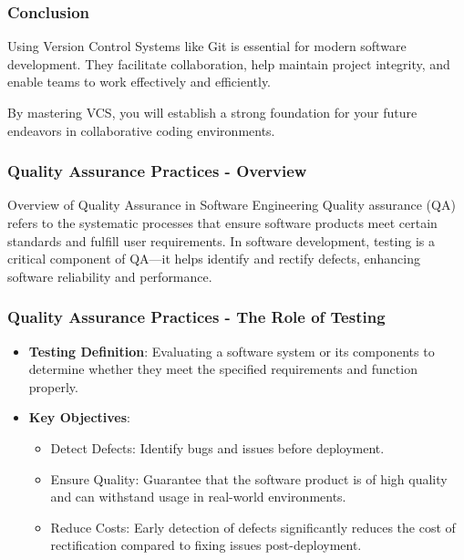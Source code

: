 \documentclass{beamer}
\begin{document}
\begin{frame}[fragile]
    \frametitle{Conclusion}
    Using Version Control Systems like Git is essential for modern software development. They facilitate collaboration, help maintain project integrity, and enable teams to work effectively and efficiently.
    
    By mastering VCS, you will establish a strong foundation for your future endeavors in collaborative coding environments.
\end{frame}

\begin{frame}[fragile]
    \frametitle{Quality Assurance Practices - Overview}
    \begin{block}{Overview of Quality Assurance in Software Engineering}
        Quality assurance (QA) refers to the systematic processes that ensure software products meet certain standards and fulfill user requirements. In software development, testing is a critical component of QA—it helps identify and rectify defects, enhancing software reliability and performance.
    \end{block}
\end{frame}

\begin{frame}[fragile]
    \frametitle{Quality Assurance Practices - The Role of Testing}
    \begin{itemize}
        \item \textbf{Testing Definition}: Evaluating a software system or its components to determine whether they meet the specified requirements and function properly.
        \item \textbf{Key Objectives}:
        \begin{itemize}
            \item Detect Defects: Identify bugs and issues before deployment.
            \item Ensure Quality: Guarantee that the software product is of high quality and can withstand usage in real-world environments.
            \item Reduce Costs: Early detection of defects significantly reduces the cost of rectification compared to fixing issues post-deployment.
        \end{itemize}
    \end{itemize}
\end{frame}
\end{document}
